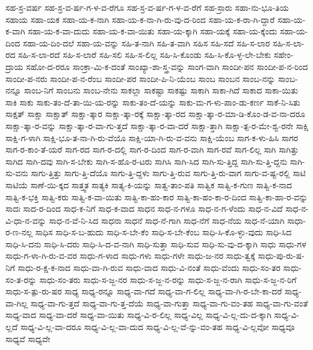 {ಸಹ-ಸ್ರ-ವರ್ಷ
ಸಹ-ಸ್ರ-ವ-ರ್ಷ-ಗ-ಳ-ವ-ರೆಗೂ
ಸಹ-ಸ್ರ-ವ-ರ್ಷ-ಗ-ಳ-ವ-ರೆಗೆ
ಸಹ-ಸ್ರಾರು
ಸಹಾ-ನು-ಭೂ-ತಿಯ
ಸಹಾಯ
ಸಹಾ-ಯಕ
ಸಹಾ-ಯ-ಕ-ನಾಗಿ
ಸಹಾ-ಯ-ಕ-ನಾ-ಗಿ-ರು-ವು-ದ-ರಿಂದ
ಸಹಾ-ಯ-ಕ-ರಾ-ಗಿ-ದ್ದಾರೆ
ಸಹಾ-ಯ-ಕ-ವಾಗಿ
ಸಹಾ-ಯ-ಕ-ವಾ-ದುದು
ಸಹಾ-ಯ-ಕ-ವಾ-ಯಿತು
ಸಹಾ-ಯ-ಕ್ಕಾಗಿ
ಸಹಾ-ಯಕ್ಕೆ
ಸಹಾ-ಯ-ಕ್ಕೆಂದು
ಸಹಾ-ಯ-ದಿಂದ
ಸಹಾ-ಯ-ದಿಂ-ದಲೆ
ಸಹಾ-ಯ-ವನ್ನು
ಸಹಿ-ತ-ನಾಗಿ
ಸಹಿ-ತ-ವಾಗಿ
ಸಹಿಸ
ಸಹಿ-ಸದೆ
ಸಹಿ-ಸ-ಲಾರ
ಸಹಿ-ಸ-ಲಾ-ರದ
ಸಹಿ-ಸ-ಲಾ-ರದೆ
ಸಹಿ-ಸ-ಲಾರೆ
ಸಹಿ-ಸಲಿ
ಸಹಿ-ಸ-ಲಿಲ್ಲ
ಸಹಿ-ಸಿ-ಕೊಂಡು
ಸಹಿ-ಸಿ-ಕೊ-ಳ್ಳ-ಲೇ-ಬೇಕು
ಸಹೇಂ-ದ್ರಾಯ
ಸಹೋ-ದ-ರರೂ
ಸಾಂಕ್ರಾ-ಮಿ-ಕ-ದಂತೆ
ಸಾಂಖ್ಯಾ-ಶಾ-ಸ್ತ್ರ-ವನ್ನು
ಸಾಂಗ-ವಾಗಿ
ಸಾಂದೀ-ಪನ
ಸಾಂದೀ-ಪ-ನ-ರಿಂದ
ಸಾಂದೀ-ಪ-ನರು
ಸಾಂದೀ-ಪ-ನ-ರೆಂಬ
ಸಾಂದೀ-ಪರ
ಸಾಂದೀ-ಪಿ-ನಿ-ಯೆಂಬ
ಸಾಂಬ
ಸಾಂಬನ
ಸಾಂಬ-ನನ್ನು
ಸಾಂಬ-ನನ್ನೂ
ಸಾಂಬ-ನಿಗೆ
ಸಾಂಬನು
ಸಾಂಬ-ನೇನು
ಸಾಕಲ್ಲಾ
ಸಾಕಷ್ಟಾ
ಸಾಕಷ್ಟು
ಸಾಕಾಗಿ
ಸಾಕಾ-ಗಿದೆ
ಸಾಕಾದ
ಸಾಕಾ-ಯಿತು
ಸಾಕಿ
ಸಾಕು
ಸಾಕು-ತಂ-ದೆ-ತಾ-ಯಿ-ಯ-ರನ್ನು
ಸಾಕು-ತಂ-ದೆ-ಯನ್ನು
ಸಾಕು-ಮ-ಗ-ಳು-ಪಾಂ-ಡು-ಕರ್ಣ
ಸಾಕೆ-ನಿ-ಸಿತು
ಸಾಕ್ಷತ್
ಸಾಕ್ಷಾ
ಸಾಕ್ಷಾತ್
ಸಾಕ್ಷಾ-ತ್ಕಾರ
ಸಾಕ್ಷಾ-ತ್ಕಾ-ರಕ್ಕೆ
ಸಾಕ್ಷಾ-ತ್ಕಾ-ರದ
ಸಾಕ್ಷಾ-ತ್ಕಾ-ರ-ಮಾ-ಡಿ-ಕೊಂ-ಡ-ವ-ನಾ-ದರೂ
ಸಾಕ್ಷಾ-ತ್ಕಾ-ರ-ವನ್ನು
ಸಾಕ್ಷಾ-ತ್ಕಾ-ರ-ವಾ-ಗು-ತ್ತದೆ
ಸಾಕ್ಷಾ-ತ್ಕಾ-ರ-ವಾ-ದರೆ
ಸಾಕ್ಷಾ-ತ್ತಾಗಿ
ಸಾಕ್ಷಾ-ತ್ಪ-ರ-ಮೇ-ಶ್ವ-ರನೇ
ಸಾಕ್ಷಿ
ಸಾಕ್ಷಿ-ಗ-ಳಾಗಿ
ಸಾಕ್ಷಿ-ಭೂ-ತ-ನಾ-ಗಿ-ರು-ವೆಯೊ
ಸಾಕ್ಷಿ-ಯಾ-ಗಿ-ರು-ವ-ವನು
ಸಾಕ್ಷಿ-ಯೆಂಬ
ಸಾಗ-ಕ-ಳು-ಹಿಸಿ
ಸಾಗರ
ಸಾಗ-ರ-ಕಾಂ-ತೆ-ಯರೆ
ಸಾಗ-ರದ
ಸಾಗ-ರ-ದಲ್ಲಿ
ಸಾಗ-ರ-ದಿಂದ
ಸಾಗ-ರ-ವಾಗಿ
ಸಾಗ-ರವೆ
ಸಾಗ-ಲಿಲ್ಲ
ಸಾಗಿ
ಸಾಗಿತ್ತು
ಸಾಗಿದ
ಸಾಗಿ-ದವು
ಸಾಗಿ-ಸ-ಬೇಕು
ಸಾಗಿ-ಸ-ಹೊ-ರ-ಟರು
ಸಾಗಿಸಿ
ಸಾಗಿ-ಸಿದ
ಸಾಗಿ-ಸು-ತ್ತಿದ್ದ
ಸಾಗಿ-ಸು-ತ್ತಿ-ದ್ದನು
ಸಾಗಿ-ಸು-ವನು
ಸಾಗು-ತ್ತಿತ್ತು
ಸಾಗು-ತ್ತಿ-ದೆಯೊ
ಸಾಗು-ತ್ತಿ-ದ್ದಳು
ಸಾಗು-ತ್ತಿ-ರುವ
ಸಾಗು-ತ್ತಿ-ರು-ವಾಗ
ಸಾಗು-ವ-ಷ್ಟ-ರಲ್ಲಿ
ಸಾಟಿ
ಸಾಟಿಯೆ
ಸಾಣೆ-ಯಿ-ಕ್ಕದ
ಸಾತ್ತ್ವತ
ಸಾತ್ಯಕಿ
ಸಾತ್ಯ-ಕಿ-ಯನ್ನು
ಸಾತ್ವ-ತಾಂ-ಪತಿ
ಸಾತ್ವಿಕ
ಸಾತ್ವಿ-ಕ-ಗುಣ
ಸಾತ್ವಿ-ಕ-ನಾದ
ಸಾತ್ವಿ-ಕ-ಭಕ್ತಿ
ಸಾತ್ವಿ-ಕರು
ಸಾತ್ವಿ-ಕ-ವಾ-ಯಿತು
ಸಾತ್ವಿ-ಕಾ-ಹಂ-ಕಾರ
ಸಾತ್ವಿ-ಕಾ-ಹಂ-ಕಾ-ರ-ದಿಂದ
ಸಾತ್ವಿ-ಕಾ-ಹಾ-ರ-ವನ್ನು
ಸಾದಃ
ಸಾದ-ರ-ದಿಂದ
ಸಾಧ-ಕ-ನಿಗೆ
ಸಾಧ-ಕ-ವಾದ
ಸಾಧನ
ಸಾಧ-ನ-ಗಳೂ
ಸಾಧ-ನ-ಗ-ಳೆಂದು
ಸಾಧ-ನ-ವಿದೆ
ಸಾಧ-ನ-ವಿ-ಧಾ-ನ-ವನ್ನು
ಸಾಧ-ನ-ವೆ-ನಿ-ಸಿದ
ಸಾಧನಾ
ಸಾಧನೆ
ಸಾಧ-ನೆ-ಗಾಗಿ
ಸಾಧ-ನೆಗೆ
ಸಾಧ-ನೆಯ
ಸಾಧ-ನೆ-ಯಾಗಿ
ಸಾಧಾ-ರ-ಣ-ನಲ್ಲ
ಸಾಧಿಸ
ಸಾಧಿ-ಸ-ಬ-ಹುದು
ಸಾಧಿ-ಸ-ಬೇ-ಕೆಂ
ಸಾಧಿ-ಸ-ಬೇ-ಕೆಂಬ
ಸಾಧಿ-ಸಿ-ಕೊ-ಳ್ಳು-ವುದು
ಸಾಧಿ-ಸಿದ
ಸಾಧಿ-ಸಿ-ದನು
ಸಾಧಿ-ಸಿ-ದರು
ಸಾಧಿ-ಸಿ-ದ-ವ-ನಾಗಿ
ಸಾಧಿ-ಸುತ್ತಾ
ಸಾಧಿ-ಸುವ
ಸಾಧಿ-ಸು-ವು-ದ-ಕ್ಕಾಗಿ
ಸಾಧು
ಸಾಧು-ಗಳ
ಸಾಧು-ಗ-ಳಾ-ಗಿ-ರು-ವ-ವರ
ಸಾಧು-ಗ-ಳಾದ
ಸಾಧು-ಗಳು
ಸಾಧು-ಗಳೇ
ಸಾಧು-ಜ-ನರ
ಸಾಧು-ತ್ವಕ್ಕೆ
ಸಾಧು-ಪು-ರು-ಷ-ನಿಗೆ
ಸಾಧು-ರ-ಕ್ಷ-ಕ-ನಾದ
ಸಾಧು-ವಾ-ಗಿ-ರುವ
ಸಾಧು-ವಾದ
ಸಾಧು-ವಿ-ನಂತೆ
ಸಾಧು-ವೆಂದು
ಸಾಧು-ಸಂ-ತರ
ಸಾಧು-ಸಂ-ತ-ರನ್ನು
ಸಾಧು-ಸಂ-ತರು
ಸಾಧು-ಸ-ಜ್ಜ-ನರ
ಸಾಧು-ಸ-ಜ್ಜ-ನ-ರನ್ನು
ಸಾಧು-ಸ-ಜ್ಜ-ನ-ರಾಗಿ
ಸಾಧು-ಸ-ಜ್ಜ-ನ-ರಿಗೆ
ಸಾಧು-ಸ-ತ್ಪು-ರು-ಷರ
ಸಾಧ್ಯ
ಸಾಧ್ಯ-ರನ್ನೂ
ಸಾಧ್ಯ-ವಾ-ಗದೆ
ಸಾಧ್ಯ-ವಾ-ಗ-ಲಿಲ್ಲ
ಸಾಧ್ಯ-ವಾ-ಗಿ-ರ-ಬೇ-ಕಾ-ದರೆ
ಸಾಧ್ಯ-ವಾ-ಗಿಲ್ಲ
ಸಾಧ್ಯ-ವಾ-ಗು-ತ್ತದೆ
ಸಾಧ್ಯ-ವಾ-ಗು-ತ್ತ-ದೆಯೆ
ಸಾಧ್ಯ-ವಾ-ಗುತ್ತಾ
ಸಾಧ್ಯ-ವಾ-ಗು-ವಂ-ತಹ
ಸಾಧ್ಯ-ವಾ-ಗು-ವಂತೆ
ಸಾಧ್ಯ-ವಾದ
ಸಾಧ್ಯ-ವಾ-ದರೆ
ಸಾಧ್ಯ-ವಾ-ಯಿತು
ಸಾಧ್ಯ-ವಿ-ರ-ಲಿಲ್ಲ
ಸಾಧ್ಯ-ವಿಲ್ಲ
ಸಾಧ್ಯ-ವಿ-ಲ್ಲ-ದು-ದ-ಕ್ಕಾಗಿ
ಸಾಧ್ಯ-ವಿ-ಲ್ಲದೆ
ಸಾಧ್ಯ-ವಿ-ಲ್ಲ-ವಾ-ದರೂ
ಸಾಧ್ಯ-ವಿ-ಲ್ಲ-ವಾ-ದುದ
ಸಾಧ್ಯ-ವಿ-ಲ್ಲ-ವೆ-ನ್ನು-ವಂ-ತಹ
ಸಾಧ್ಯ-ವಿ-ಲ್ಲವೋ
ಸಾಧ್ಯವೂ
ಸಾಧ್ಯವೆ
ಸಾಧ್ಯವೇ
}
